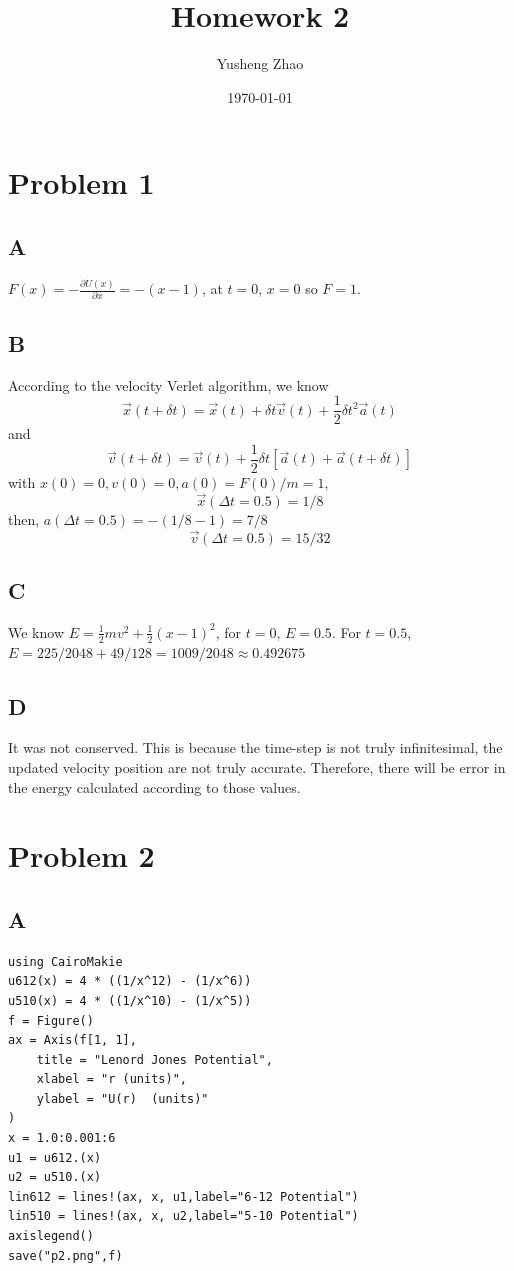 \documentclass[11pt]{article}
\author{Yusheng Zhao}
\date{\today}
\title{Homework 2}
\begin{document}
\maketitle
\tableofcontents


\section{Problem 1}
\label{sec:org5931637}
\subsection{A}
\label{sec:org1ee1d7a}
\(F(x) = - \frac{\partial U(x)}{\partial x} = -(x-1)\), at \(t=0\), \(x=0\) so \(F= 1\).
\subsection{B}
\label{sec:orgb6f50ab}
According to the velocity Verlet algorithm, we know
\[\vec{x}(t+\delta t) = \vec{x}(t) + \delta t \vec{v}(t) + \frac{1}{2} \delta t^2 \vec{a}(t)\]
and
\[\vec{v}(t + \delta t) = \vec{v}(t) + \frac{1}{2}\delta t [\vec{a}(t) + \vec{a}(t+\delta t)]\]
with \(x(0)  = 0, v(0) = 0, a(0) = F(0)/m = 1\),
\[\vec{x}(\Delta t = 0.5)  = 1/8 \]
then,  \(a(\Delta t = 0.5) = -(1/8-1) = 7/8\)
\[ \vec{v}(\Delta t = 0.5) =  15/32\]
\subsection{C}
\label{sec:orgfdb1e6e}
We know \(E = \frac{1}{2}mv^2 + \frac{1}{2}(x-1)^2\), for \(t = 0\), \(E = 0.5\). For \(t = 0.5\), \(E = 225/2048 + 49/128 = 1009/2048 \approx 0.492675\)
\subsection{D}
\label{sec:org944e1db}
It was not conserved. This is because the time-step is not truly infinitesimal,
the updated velocity position are not truly accurate. Therefore, there will be
error in the energy calculated according to those values.

\section{Problem 2}
\label{sec:org6e0bdf5}
\subsection{A}
\label{sec:org5df4b88}
\begin{verbatim}
using CairoMakie
u612(x) = 4 * ((1/x^12) - (1/x^6))
u510(x) = 4 * ((1/x^10) - (1/x^5))
f = Figure()
ax = Axis(f[1, 1],
    title = "Lenord Jones Potential",
    xlabel = "r (units)",
    ylabel = "U(r)  (units)"
)
x = 1.0:0.001:6
u1 = u612.(x)
u2 = u510.(x)
lin612 = lines!(ax, x, u1,label="6-12 Potential")
lin510 = lines!(ax, x, u2,label="5-10 Potential")
axislegend()
save("p2.png",f)
\end{verbatim}
\end{document}
